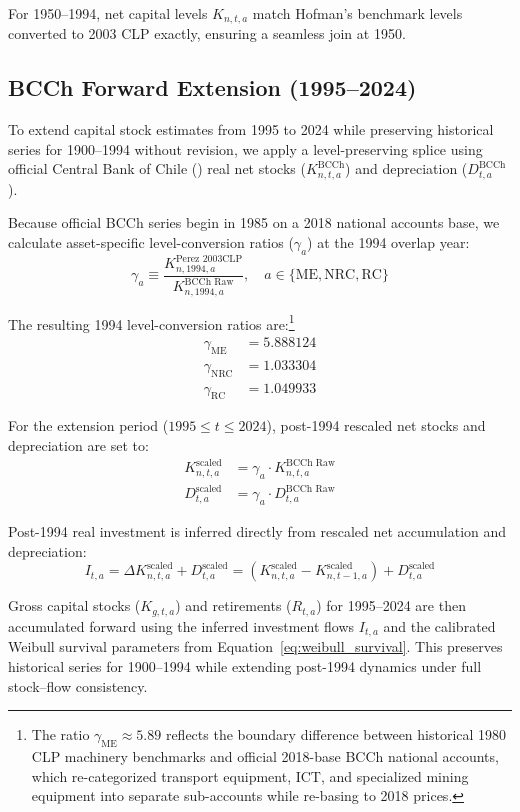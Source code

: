 For 1950--1994, net capital levels $K_{n,t,a}$ match Hofman's benchmark levels converted to 2003 CLP exactly, ensuring a seamless join at 1950.

\subsection{BCCh Forward Extension (1995--2024)}
To extend capital stock estimates from 1995 to 2024 while preserving historical series for 1900--1994 without revision, we apply a level-preserving splice using official Central Bank of Chile (\citealt{BCCH2024}) real net stocks ($K_{n,t,a}^{\text{BCCh}}$) and depreciation ($D_{t,a}^{\text{BCCh}}$).

Because official BCCh series begin in 1985 on a 2018 national accounts base, we calculate asset-specific level-conversion ratios ($\gamma_a$) at the 1994 overlap year:
\begin{equation}\label{eq:bridge_factor}
\gamma_a \equiv \frac{K_{n,1994,a}^{\text{Perez 2003CLP}}}{K_{n,1994,a}^{\text{BCCh Raw}}}, \quad a \in \{\text{ME}, \text{NRC}, \text{RC}\}
\end{equation}

The resulting 1994 level-conversion ratios are:\footnote{The ratio $\gamma_{\text{ME}} \approx 5.89$ reflects the boundary difference between historical 1980 CLP machinery benchmarks and official 2018-base BCCh national accounts, which re-categorized transport equipment, ICT, and specialized mining equipment into separate sub-accounts while re-basing to 2018 prices.}
\begin{align}
\gamma_{\text{ME}} &= 5.888124 \label{eq:gamma_me} \\
\gamma_{\text{NRC}} &= 1.033304 \label{eq:gamma_nrc} \\
\gamma_{\text{RC}} &= 1.049933 \label{eq:gamma_rc}
\end{align}

For the extension period ($1995 \le t \le 2024$), post-1994 rescaled net stocks and depreciation are set to:
\begin{align}
K_{n,t,a}^{\text{scaled}} &= \gamma_a \cdot K_{n,t,a}^{\text{BCCh Raw}} \label{eq:scaled_kn} \\
D_{t,a}^{\text{scaled}} &= \gamma_a \cdot D_{t,a}^{\text{BCCh Raw}} \label{eq:scaled_d}
\end{align}

Post-1994 real investment is inferred directly from rescaled net accumulation and depreciation:
\begin{equation}\label{eq:inferred_I}
I_{t,a} = \Delta K_{n,t,a}^{\text{scaled}} + D_{t,a}^{\text{scaled}} = (K_{n,t,a}^{\text{scaled}} - K_{n,t-1,a}^{\text{scaled}}) + D_{t,a}^{\text{scaled}}
\end{equation}

Gross capital stocks ($K_{g,t,a}$) and retirements ($R_{t,a}$) for 1995--2024 are then accumulated forward using the inferred investment flows $I_{t,a}$ and the calibrated Weibull survival parameters from Equation~\eqref{eq:weibull_survival}. This preserves historical series for 1900--1994 while extending post-1994 dynamics under full stock--flow consistency.
